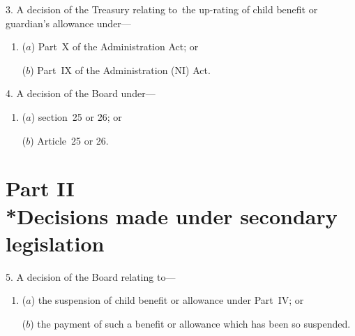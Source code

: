 \documentclass[12pt,a4paper]{article}
\begin{document}
\medskip

3.  A decision of the Treasury relating to~the up-rating of child benefit or guardian’s allowance under—
\begin{enumerate}\item[]
($a$) Part~X of the Administration Act; or

($b$) Part~IX of the Administration (NI) Act.
\end{enumerate}

\medskip

4.  A decision of the Board under—
\begin{enumerate}\item[]
($a$) section~25 or 26; or

($b$) Article~25 or 26.
\end{enumerate}

\section[Part II --- Decisions made under secondary legislation]{Part II\\*Decisions made under secondary legislation}

\renewcommand\parthead{--- Schedule 2 Part II}

5.  A decision of the Board relating to—
\begin{enumerate}\item[]
($a$) the suspension of child benefit or allowance under Part~IV; or

($b$) the payment of such a benefit or allowance which has been so suspended.
\end{enumerate}

\medskip
\end{document}
